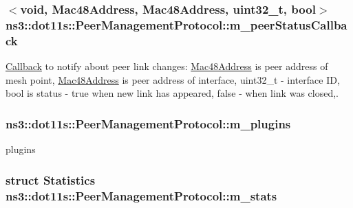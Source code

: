 \subsubsection[{\texorpdfstring{m\+\_\+peer\+Status\+Callback}{m_peerStatusCallback}}]{$<$void, {\bf Mac48\+Address}, {\bf Mac48\+Address}, uint32\+\_\+t, bool$>$ ns3\+::dot11s\+::\+Peer\+Management\+Protocol\+::m\+\_\+peer\+Status\+Callback\hspace{0.3cm}{\ttfamily [private]}}\hypertarget{classns3_1_1dot11s_1_1PeerManagementProtocol_a13e049e3ed8a3eb6adb1aab09c9aa88f}{}\label{classns3_1_1dot11s_1_1PeerManagementProtocol_a13e049e3ed8a3eb6adb1aab09c9aa88f}


\hyperlink{classns3_1_1Callback}{Callback} to notify about peer link changes\+: \hyperlink{classns3_1_1Mac48Address}{Mac48\+Address} is peer address of mesh point, \hyperlink{classns3_1_1Mac48Address}{Mac48\+Address} is peer address of interface, uint32\+\_\+t -\/ interface ID, bool is status -\/ true when new link has appeared, false -\/ when link was closed,. 

\subsubsection[{\texorpdfstring{m\+\_\+plugins}{m_plugins}}]{ ns3\+::dot11s\+::\+Peer\+Management\+Protocol\+::m\+\_\+plugins\hspace{0.3cm}{\ttfamily [private]}}\hypertarget{classns3_1_1dot11s_1_1PeerManagementProtocol_a9000d20f6feb3db279a020b237f49d64}{}\label{classns3_1_1dot11s_1_1PeerManagementProtocol_a9000d20f6feb3db279a020b237f49d64}


plugins 

\subsubsection[{\texorpdfstring{m\+\_\+stats}{m_stats}}]{\setlength{\rightskip}{0pt plus 5cm}struct {\bf Statistics} ns3\+::dot11s\+::\+Peer\+Management\+Protocol\+::m\+\_\+stats\hspace{0.3cm}{\ttfamily [private]}}\hypertarget{classns3_1_1dot11s_1_1PeerManagementProtocol_a3f618c99718829447348b1ad19b208d7}{}\label{classns3_1_1dot11s_1_1PeerManagementProtocol_a3f618c99718829447348b1ad19b208d7}


